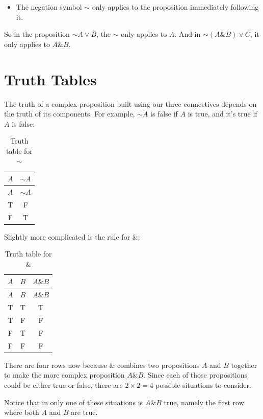 \documentclass[justified]{tufte-book}
\renewcommand{\neg}{\mathbin{\sim}}
\renewcommand{\wedge}{\mathbin{\&}}
\newenvironment{info}{\begin{itemize}\item[\Info]}{\end{itemize}}
\theoremstyle{definition}
\theoremstyle{definition}
\theoremstyle{definition}
\theoremstyle{definition}
\theoremstyle{remark}
\begin{document}
\begin{info}
The negation symbol \(\mathbin{\sim}\) only applies to the proposition
immediately following it.
\end{info}

So in the proposition \(\neg A \vee B\), the \(\neg\) only applies to \(A\). And in \(\neg (A \wedge B) \vee C\), it only applies to \(A \wedge B\).

\hypertarget{truth-tables-1}{%
\section{Truth Tables}\label{truth-tables-1}}

The truth of a complex proposition built using our three connectives depends on the truth of its components. For example, \(\neg A\) is false if \(A\) is true, and it's true if \(A\) is false:

\begin{longtable}[]{@{}cc@{}}
\caption{\label{tab:unnamed-chunk-23}Truth table for \(\neg\)}\tabularnewline
\toprule
\(A\) & \(\neg A\) \\
\midrule
\endfirsthead
\toprule
\(A\) & \(\neg A\) \\
\midrule
\endhead
T & F \\
F & T \\
\bottomrule
\end{longtable}

Slightly more complicated is the rule for \(\&\):

\begin{longtable}[]{@{}ccc@{}}
\caption{\label{tab:unnamed-chunk-24}Truth table for \(\wedge\)}\tabularnewline
\toprule
\(A\) & \(B\) & \(A \wedge B\) \\
\midrule
\endfirsthead
\toprule
\(A\) & \(B\) & \(A \wedge B\) \\
\midrule
\endhead
T & T & T \\
T & F & F \\
F & T & F \\
F & F & F \\
\bottomrule
\end{longtable}

There are four rows now because \(\&\) combines two propositions \(A\) and \(B\) together to make the more complex proposition \(A \& B\). Since each of those propositions could be either true or false, there are \(2 \times 2 = 4\) possible situations to consider.

Notice that in only one of these situations is \(A \& B\) true, namely the first row where both \(A\) and \(B\) are true.
\end{document}
